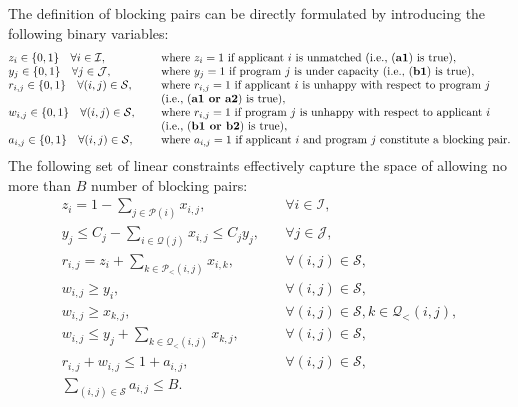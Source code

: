 \documentclass[11pt]{article}
\begin{document}
The definition of blocking pairs can be directly formulated by introducing the following binary variables:   
\[
\begin{array}{@{}l l@{}}
    z_i  \in  \{0,1\}  \quad \forall i \in \mathcal{I}, &\quad \text{ where $z_i=1$ if applicant $i$ is unmatched (i.e., ({\bf  a1}) is true)}, \\
    y_j  \in  \{0,1\}  \quad \forall j \in \mathcal{J}, &\quad \text{ where $y_j=1$ if program $j$ is under capacity (i.e., ({\bf  b1}) is true)}, \\
    r_{i,j} \in  \{0,1\}  \quad \forall (i,j) \in \mathcal{S}, &\quad \text{ where $r_{i,j} =1$ if applicant $i$ is unhappy with respect to program $j$}\\
    & \quad \text{ (i.e., ({\bf  a1 or a2}) is true)} ,  \\
    w_{i,j} \in  \{0,1\}  \quad \forall (i,j) \in \mathcal{S}, &\quad \text{ where $r_{i,j} =1$ if program $j$ is unhappy with respect to applicant $i$}  \\
    &\quad \text{ (i.e., ({\bf  b1 or b2}) is true)}, \\
    a_{i,j} \in \{0,1\}  \quad \forall (i,j) \in \mathcal{S}, &\quad \text{ where $a_{i,j}=1$ if applicant $i$ and program $j$ constitute a blocking pair}.
\end{array}
\]
The following set of linear constraints effectively capture the space of allowing no more than $B$ number of blocking pairs: 
\begin{align}
    z_i = 1 - \sum_{j\in \mathcal{P}(i)}x_{i,j}, & \quad \forall i \in \mathcal{I}, \label{const:stu_unmatched} \\
    y_j \le C_j - \sum_{i\in \mathcal{Q}(j)} x_{i,j} \le C_j y_j, & \quad \forall j \in \mathcal{J}, \label{const:sch_under_capacity} \\ 
    r_{i,j} = z_i + \sum_{k \in \mathcal{P}_{<}(i,j)}x_{i,k}, & \quad \forall (i,j) \in \mathcal{S}, \label{const:stu_unhappy} \\
    w_{i,j} \ge y_i , & \quad \forall (i,j) \in \mathcal{S}, \label{const:sch_unhappy1} \\
    w_{i,j} \ge x_{k,j} , & \quad \forall (i,j) \in \mathcal{S}, k \in \mathcal{Q}_{<}(i,j),  \label{const:sch_unhappy2}\\
    w_{i,j} \le y_j + \sum_{k \in \mathcal{Q}_{<}(i,j)}x_{k,j}, & \quad \forall (i,j) \in \mathcal{S},\label{const:sch_unhappy3} \\ 
    r_{i,j} + w_{i,j} \le 1 + a_{i,j}, & \quad \forall (i,j) \in \mathcal{S}, \label{const:blocking} \\
    \sum_{(i,j) \in \mathcal{S}} a_{i,j} \le B. \label{const:blocking_number}
\end{align}
\end{document}
